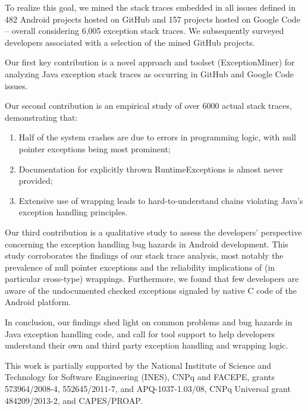 To realize this goal, we mined the stack
traces embedded in all issues defined in 482 Android projects hosted on GitHub and
157 projects hosted on Google Code -- overall considering 6,005
exception stack traces. We subsequently surveyed developers associated with
a selection of
the mined GitHub projects.

Our first key contribution is
a novel approach and toolset (ExceptionMiner) for analyzing Java
  exception stack traces as occurring in GitHub and Google Code
  issues.

Our second contribution is
an empirical study of over 6000 actual stack traces,
  demonstrating that:
\begin{enumerate}
  \item Half of the system crashes are due to errors
  in programming logic, with null pointer exceptions being most
  prominent;
  \item Documentation for explicitly thrown RuntimeExceptions is almost
  never provided;
  \item Extensive use of wrapping leads to hard-to-understand chains
  violating Java's exception handling principles.
\end{enumerate}

Our third contribution is a qualitative study to assess the
developers' perspective concerning the exception handling
bug hazards in Android development.
This study corroborates the findings of our stack trace analysis, most notably the prevalence
of null pointer exceptions and the reliability implications of (in particular cross-type) wrappings.
Furthermore, we found that few developers are aware of the undocumented checked exceptions signaled by native C code of the Android platform.

In conclusion, our findings shed light on common problems and bug hazards in Java
exception handling code, and call for tool support to help developers
understand their own and third party exception handling and wrapping logic.

\begin{acknowledgements}
This work is partially supported by the National Institute of Science and Technology for Software Engineering (INES), CNPq and FACEPE, grants 573964/2008-4, 552645/2011-7, and APQ-1037-1.03/08, CNPq Universal grant 484209/2013-2, and CAPES/PROAP.
\end{acknowledgements}



